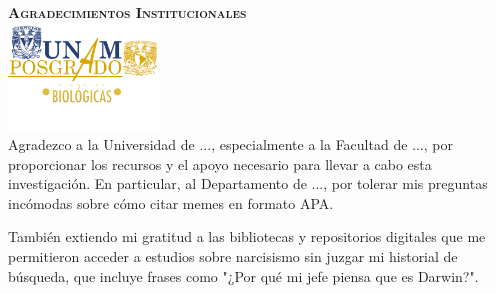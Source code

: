 \begin{center}
    {\LARGE \textbf{\textsc{Agradecimientos Institucionales}}}\\[0.5cm]
    \includegraphics[width=4cm]{./figuras/unamposgrado.png}\\[0.5cm]

    Agradezco a la Universidad de ..., especialmente a la Facultad de ..., por proporcionar los recursos y el apoyo necesario para llevar a cabo esta investigación. En particular, al Departamento de ..., por tolerar mis preguntas incómodas sobre cómo citar memes en formato APA.

    También extiendo mi gratitud a las bibliotecas y repositorios digitales que me permitieron acceder a estudios sobre narcisismo sin juzgar mi historial de búsqueda, que incluye frases como "¿Por qué mi jefe piensa que es Darwin?".
\end{center}
